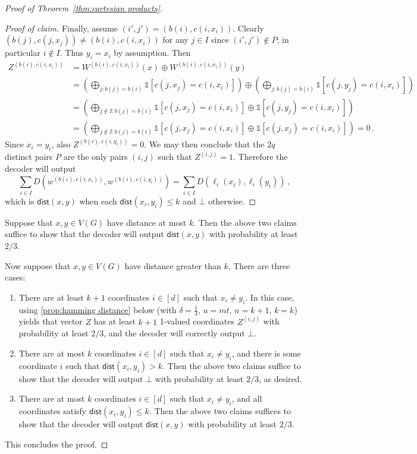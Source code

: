 \documentclass{theoretics}
\newcommand{\dist}{\mathsf{dist}}
\newcommand{\ind}[1]{\mathds{1} \left[ #1 \right] }
\begin{document}
\begin{proof}[Proof of Theorem~\ref{thm:cartesian products}]
\begin{proof}[Proof of claim]
Finally, assume $(i',j') = (b(i),c(i,x_i))$.
Clearly $(b(j),c(j,x_j)) \neq (b(i),c(i,x_i))$ for any $j \in I$ since $(i',j') \notin P$;
in particular $i \notin I$. Thus $y_i = x_i$ by assumption.
Then
\begin{align*}
  Z^{(b(i), c(i,x_i))}
  &= W^{(b(i), c(i,x_i))}(x) \oplus W^{(b(i), c(i,x_i))}(y) \\
  &= \left( \bigoplus_{j : b(j)=b(i)} \ind{c(j,x_j)=c(i,x_i)} \right) \oplus
     \left( \bigoplus_{j : b(j)=b(i)} \ind{c(j,y_j)=c(i,x_i)} \right) \\
  &= \left( \bigoplus_{j \notin I: b(j)=b(i)} \ind{c(j,x_j)=c(i,x_i)}
      \oplus \ind{c(j,y_j)=c(i,x_i)} \right) \\
  &= \left( \bigoplus_{j \notin I: b(j)=b(i)} \ind{c(j,x_j)=c(i,x_i)}
      \oplus \ind{c(j,x_j)=c(i,x_i)} \right) = 0 \,.
\end{align*}
Since $x_i=y_i$, also $Z^{(b(i), c(i,y_i))}=0$. We may then conclude that the $2q$ distinct
pairs $P$ are the only pairs $(i,j)$ such that $Z^{(i,j)}=1$. Therefore the decoder will output
\[
  \sum_{i \in I} D\left( w^{(b(i),c(i,x_i))}, w^{(b(i),c(i,y_i))} \right)
  = \sum_{i \in I} D\left( \ell_i(x_i), \ell_i(y_i) \right) \,,
\]
which is $\dist(x,y)$ when each $\dist(x_i,y_i) \leq k$ and $\bot$ otherwise.
\end{proof}
Suppose that $x,y \in V(G)$ have distance at most $k$. Then the above two claims suffice to show
that the decoder will output $\dist(x,y)$ with probability at least $2/3$.

Now suppose that $x,y \in V(G)$ have distance greater than $k$. There are three cases:
\begin{enumerate}
\item There are at least $k+1$ coordinates $i \in [d]$ such that $x_i \neq y_i$. In this case, using
\cref{prop:hamming distance} below (with $\delta=\frac13$, $u=mt$, $n=k+1$, $k=k$) yields
that vector $Z$ has at least $k+1$ 1-valued coordinates
$Z^{(i,j)}$ with probability at least $2/3$, and the decoder will correctly output $\bot$.
\item There are at most $k$ coordinates $i \in [d]$ such that $x_i \neq y_i$, and there is some
coordinate $i$ such that $\dist(x_i,y_i) > k$. Then the above two claims suffice to show that the
decoder will output $\bot$ with probability at least $2/3$, as desired.
\item There are at most $k$ coordinates $i \in [d]$ such that $x_i \neq y_i$, and all coordinates
satisfy $\dist(x_i,y_i) \leq k$. Then the above two claims suffices to show that the decoder will
output $\dist(x,y)$ with probability at least $2/3$.
\end{enumerate}
This concludes the proof.
\end{proof}
\end{document}
